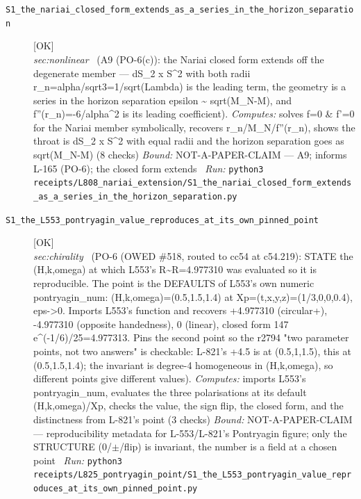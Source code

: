 \begin{description}
\item[\label{rcpt:S1_the_nariai_closed_form_extends_as_a_series_in_the_horizon_separation}\textbf{}\quad\texttt{S1\_the\_nariai\_closed\_form\_extends\_as\_a\_series\_in\_the\_horizon\_separation}]\hfill\textsf{[OK]}\\
\textit{sec:nonlinear} \ (A9 (PO-6(c)): the Nariai closed form extends off the degenerate member --- dS\_2 x S\textasciicircum{}2 with both radii r\_n=alpha/sqrt3=1/sqrt(Lambda) is the leading term, the geometry is a series in the horizon separation epsilon \textasciitilde{} sqrt(M\_N-M), and f''(r\_n)=-6/alpha\textasciicircum{}2 is its leading coefficient). 
\emph{Computes:} solves f=0 \& f'=0 for the Nariai member symbolically, recovers r\_n/M\_N/f''(r\_n), shows the throat is dS\_2 x S\textasciicircum{}2 with equal radii and the horizon separation goes as sqrt(M\_N-M) (8 checks)
 \emph{Bound:} NOT-A-PAPER-CLAIM --- A9; informs L-165 (PO-6); the closed form extends
\ \emph{Run:} \texttt{python3 receipts/L808\_nariai\_extension/S1\_the\_nariai\_closed\_form\_extends\_as\_a\_series\_in\_the\_horizon\_separation.py}
\item[\label{rcpt:S1_the_L553_pontryagin_value_reproduces_at_its_own_pinned_point}\textbf{}\quad\texttt{S1\_the\_L553\_pontryagin\_value\_reproduces\_at\_its\_own\_pinned\_point}]\hfill\textsf{[OK]}\\
\textit{sec:chirality} \ (PO-6 (OWED \#518, routed to cc54 at c54.219): STATE the (H,k,omega) at which L553's R\textasciitilde{}R=4.977310 was evaluated so it is reproducible. The point is the DEFAULTS of L553's own numeric pontryagin\_num: (H,k,omega)=(0.5,1.5,1.4) at Xp=(t,x,y,z)=(1/3,0,0,0.4), eps->0. Imports L553's function and recovers +4.977310 (circular+), -4.977310 (opposite handedness), 0 (linear), closed form 147 e\textasciicircum{}(-1/6)/25=4.977313. Pins the second point so the r2794 "two parameter points, not two answers" is checkable: L-821's +4.5 is at (0.5,1,1.5), this at (0.5,1.5,1.4); the invariant is degree-4 homogeneous in (H,k,omega), so different points give different values). 
\emph{Computes:} imports L553's pontryagin\_num, evaluates the three polarisations at its default (H,k,omega)/Xp, checks the value, the sign flip, the closed form, and the distinctness from L-821's point (3 checks)
 \emph{Bound:} NOT-A-PAPER-CLAIM --- reproducibility metadata for L-553/L-821's Pontryagin figure; only the STRUCTURE (0/\ensuremath{\pm}/flip) is invariant, the number is a field at a chosen point
\ \emph{Run:} \texttt{python3 receipts/L825\_pontryagin\_point/S1\_the\_L553\_pontryagin\_value\_reproduces\_at\_its\_own\_pinned\_point.py}

\end{description}
